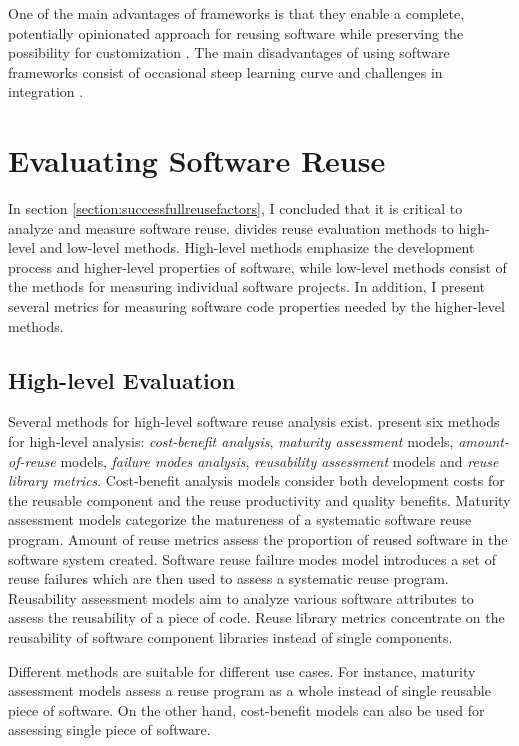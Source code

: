 One of the main advantages of frameworks is that they enable a complete, potentially opinionated approach for reusing software while preserving the possibility for customization \citep{johnson_frameworkscomponents+_1997}. The main disadvantages of using software frameworks consist of occasional steep learning curve and challenges in integration \citep{fayad_object-oriented_1997}.

\section{Evaluating Software Reuse}
\label{section:evaluatingreuse}

In section \ref{section:successfullreusefactors}, I concluded that it is critical to analyze and measure software reuse. \citet{frakes_software_1996} divides reuse evaluation methods to high-level and low-level methods. High-level methods emphasize the development process and higher-level properties of software, while low-level methods consist of the methods for measuring individual software projects. In addition, I present several metrics for measuring software code properties needed by the higher-level methods.

\subsection{High-level Evaluation}

Several methods for high-level software reuse analysis exist. \citet{frakes_software_1996} present six methods for high-level analysis: \emph{cost-benefit analysis}, \emph{maturity assessment} models, \emph{amount-of-reuse} models, \emph{failure modes analysis}, \emph{reusability assessment} models and \emph{reuse library metrics}. Cost-benefit analysis models consider both development costs for the reusable component and the reuse productivity and quality benefits. Maturity assessment models categorize the matureness of a systematic software reuse program. Amount of reuse metrics assess the proportion of reused software in the software system created. Software reuse failure modes model introduces a set of reuse failures which are then used to assess a systematic reuse program. Reusability assessment models aim to analyze various software attributes to assess the reusability of a piece of code. Reuse library metrics concentrate on the reusability of software component libraries instead of single components.

Different methods are suitable for different use cases. For instance, maturity assessment models assess a reuse program as a whole instead of single reusable piece of software. On the other hand, cost-benefit models can also be used for assessing single piece of software.

